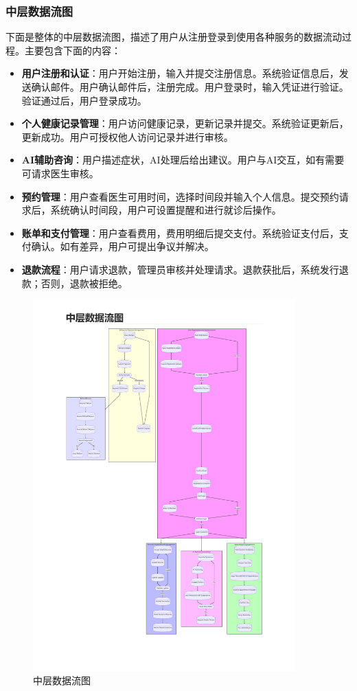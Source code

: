 \subsubsection{中层数据流图}
下面是整体的中层数据流图，描述了用户从注册登录到使用各种服务的数据流动过程。主要包含下面的内容：
\begin{itemize}
	\item \textbf{用户注册和认证}：用户开始注册，输入并提交注册信息。系统验证信息后，发送确认邮件。用户确认邮件后，注册完成。用户登录时，输入凭证进行验证。验证通过后，用户登录成功。
	\item \textbf{个人健康记录管理}：用户访问健康记录，更新记录并提交。系统验证更新后，更新成功。用户可授权他人访问记录并进行审核。
	\item \textbf{AI辅助咨询}：用户描述症状，AI处理后给出建议。用户与AI交互，如有需要可请求医生审核。
	\item \textbf{预约管理}：用户查看医生可用时间，选择时间段并输入个人信息。提交预约请求后，系统确认时间段，用户可设置提醒和进行就诊后操作。
	\item \textbf{账单和支付管理}：用户查看费用，费用明细后提交支付。系统验证支付后，支付确认。如有差异，用户可提出争议并解决。
	\item \textbf{退款流程}：用户请求退款，管理员审核并处理请求。退款获批后，系统发行退款；否则，退款被拒绝。
\end{itemize}
\begin{figure}[htbp]
	\centering
	\includegraphics[width=0.9\textwidth]{figures/02.pdf}
	\caption{中层数据流图}
\end{figure}

